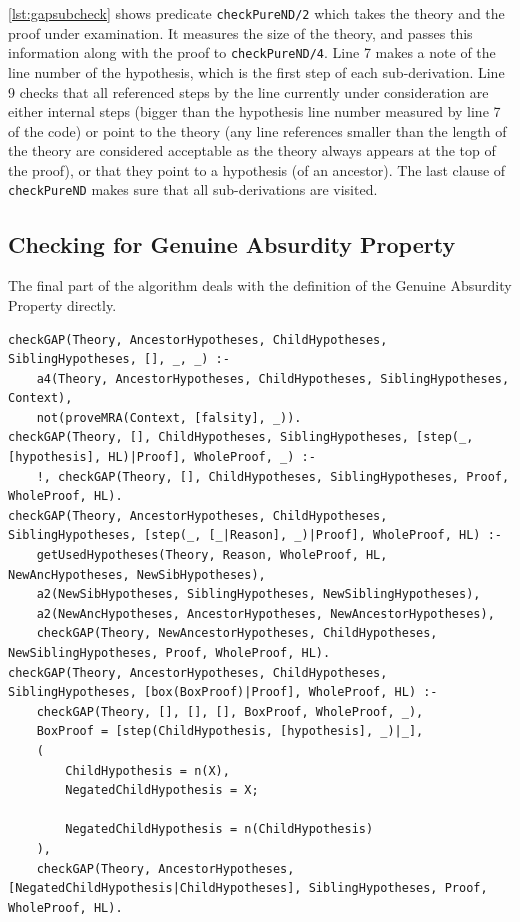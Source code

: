 \documentclass[11pt,twoside,a4paper]{report}
\begin{document}
\autoref{lst:gapsubcheck} shows predicate \lstinline$checkPureND/2$ which takes the theory and the proof under examination. It measures the size of the theory, and passes this information along with the proof to \lstinline$checkPureND/4$. Line 7 makes a note of the line number of the hypothesis, which is the first step of each sub-derivation. Line 9 checks that all referenced steps by the line currently under consideration are either internal steps (bigger than the hypothesis line number measured by line 7 of the code) or point to the theory (any line references smaller than the length of the theory are considered acceptable as the theory always appears at the top of the proof), or that they point to a hypothesis (of an ancestor). The last clause of \lstinline$checkPureND$ makes sure that all sub-derivations are visited.

\subsection{Checking for Genuine Absurdity Property}
The final part of the algorithm deals with the definition of the Genuine Absurdity Property directly.

\begin{lstlisting}[caption={Checking whether a proof follows the Genuine Absurdity Property},label=lst:gapgapcheck]
% Checks for the actual GAP for each (sub)derivation in the proof
checkGAP(Theory, AncestorHypotheses, ChildHypotheses, SiblingHypotheses, [], _, _) :-
	a4(Theory, AncestorHypotheses, ChildHypotheses, SiblingHypotheses, Context),
	not(proveMRA(Context, [falsity], _)).
checkGAP(Theory, [], ChildHypotheses, SiblingHypotheses, [step(_, [hypothesis], HL)|Proof], WholeProof, _) :-
	!, checkGAP(Theory, [], ChildHypotheses, SiblingHypotheses, Proof, WholeProof, HL).
checkGAP(Theory, AncestorHypotheses, ChildHypotheses, SiblingHypotheses, [step(_, [_|Reason], _)|Proof], WholeProof, HL) :-
	getUsedHypotheses(Theory, Reason, WholeProof, HL, NewAncHypotheses, NewSibHypotheses),
	a2(NewSibHypotheses, SiblingHypotheses, NewSiblingHypotheses),
	a2(NewAncHypotheses, AncestorHypotheses, NewAncestorHypotheses),
	checkGAP(Theory, NewAncestorHypotheses, ChildHypotheses, NewSiblingHypotheses, Proof, WholeProof, HL).
checkGAP(Theory, AncestorHypotheses, ChildHypotheses, SiblingHypotheses, [box(BoxProof)|Proof], WholeProof, HL) :-
	checkGAP(Theory, [], [], [], BoxProof, WholeProof, _),
	BoxProof = [step(ChildHypothesis, [hypothesis], _)|_],
	(
		ChildHypothesis = n(X),
		NegatedChildHypothesis = X;
		
		NegatedChildHypothesis = n(ChildHypothesis)
	),
	checkGAP(Theory, AncestorHypotheses, [NegatedChildHypothesis|ChildHypotheses], SiblingHypotheses, Proof, WholeProof, HL).
\end{lstlisting}
\end{document}
